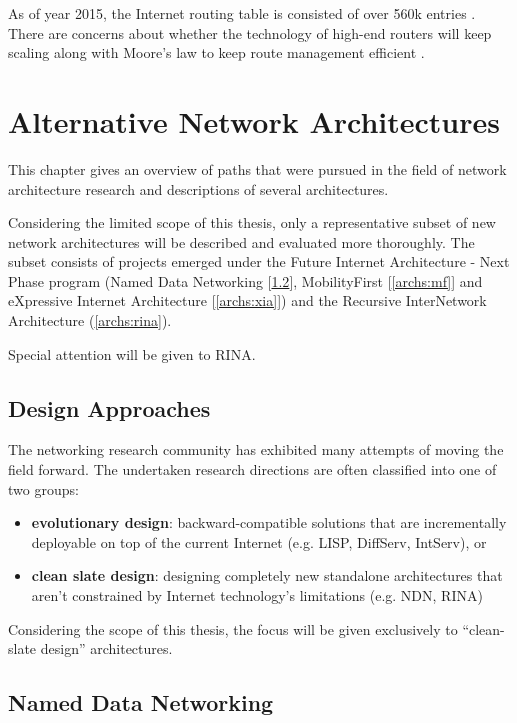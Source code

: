         As of year 2015, the Internet routing table is consisted of over 560k entries \cite{bgpgrow}. There are concerns about whether the technology of high-end routers will keep scaling along with Moore's law to keep route management efficient \cite{rfc4984}.


\chapter{Alternative Network Architectures}\label{archs}

    This chapter gives an overview of paths that were pursued in the field of network architecture research and descriptions of several architectures.

    Considering the limited scope of this thesis, only a representative subset of new network architectures will be described and evaluated more thoroughly. The subset consists of projects emerged under the Future Internet Architecture - Next Phase program \cite{fia} (Named Data Networking [\ref{archs:ndn}], MobilityFirst [\ref{archs:mf}] and eXpressive Internet Architecture [\ref{archs:xia}]) and the Recursive InterNetwork Architecture (\ref{archs:rina}).

    Special attention will be given to RINA.

    \section{Design Approaches}

        The networking research community has exhibited many attempts of moving the field forward. The undertaken research directions are often classified into one of two groups:

        \begin{itemize}
            \item \textbf{evolutionary design}: backward-compatible solutions that are incrementally deployable on top of the current Internet (e.g. LISP, DiffServ, IntServ), or
            \item \textbf{clean slate design}: designing completely new standalone architectures that aren't constrained by Internet technology's limitations (e.g. NDN, RINA)
        \end{itemize}

        Considering the scope of this thesis, the focus will be given exclusively to ``clean-slate design'' architectures.

    \section{Named Data Networking}\label{archs:ndn}

